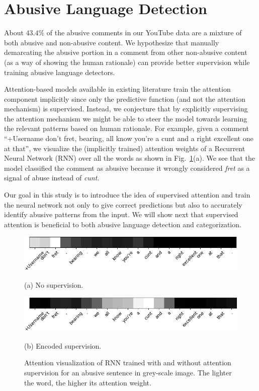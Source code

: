 \documentclass[letterpaper]{article} %
\begin{document}
\section{Abusive Language Detection}
\label{sec:detection}
About $43.4\%$ of the abusive comments in our YouTube data are a mixture of both abusive and non-abusive content. We hypothesize that manually demarcating the abusive portion in a comment from other non-abusive content (as a way of showing the human rationale) can provide better supervision while training  abusive language detectors.

Attention-based models available in existing literature train the attention component implicitly since only the predictive function (and not the attention mechanism) is supervised.
Instead, we conjecture that by explicitly supervising the attention mechanism we might be able to steer the model towards learning the relevant patterns based on human rationale. For example, given a comment ``+Username don't fret, bearing, all know you're a cunt and a right excellent one at that'', we visualize the (implicitly trained) attention weights of a Recurrent Neural Network (RNN) over all the words as shown in Fig.~\ref{fig:att_example}(a).
We see that the model classified the comment as abusive because it wrongly considered \textit{fret} as a signal of abuse instead of \textit{cunt}.

Our goal in this study is to introduce the idea of supervised attention  and train the neural network not only to give correct predictions but also to accurately identify abusive patterns from the input. We will show next that supervised attention is beneficial to both abusive language detection and categorization.


\begin{figure}[htbp!]
\captionsetup{font=normalsize}
\centering
\begin{minipage}[c]{0.65\textwidth}
\centerline{\includegraphics[width=\linewidth]{long_comm_no_att.png}}
\centerline{\small{(a) No supervision.}}
\end{minipage}
\begin{minipage}{0.65\textwidth}
\centerline{\includegraphics[width=\linewidth]{long_comm_encoded_att.png}}
\centerline{\small{(b) Encoded supervision.}}
\end{minipage}
\caption{Attention visualization of RNN trained with and without attention supervision for an abusive sentence in grey-scale image. The lighter the word, the higher its attention weight.}
\label{fig:att_example}
\end{figure}
\end{document}
